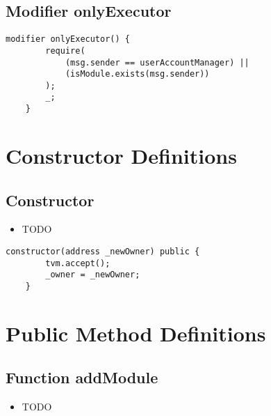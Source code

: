 \subsection{Modifier onlyExecutor}


\begin{lstlisting}[firstnumber=543]
    modifier onlyExecutor() {
        require(
            (msg.sender == userAccountManager) ||
            (isModule.exists(msg.sender))
        );
        _;
    }
\end{lstlisting}

\section{Constructor Definitions}


\subsection{Constructor}

\noindent\begin{itemize}
\item TODO
\end{itemize}

\begin{lstlisting}[firstnumber=39]
    constructor(address _newOwner) public {
        tvm.accept();
        _owner = _newOwner;
    }
\end{lstlisting}

\section{Public Method Definitions}


\subsection{Function addModule}

\noindent\begin{itemize}
\item TODO
\end{itemize}

